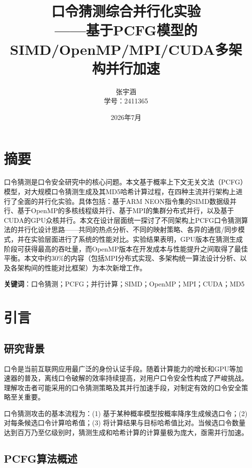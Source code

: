 \documentclass[12pt,a4paper]{ctexart}
\title{{\Huge 口令猜测综合并行化实验}\\[0.5cm]
       {\large ——基于PCFG模型的SIMD/OpenMP/MPI/CUDA多架构并行加速}}
\author{张宇涵\\学号：2411365}
\date{2026年7月}
\begin{document}
\maketitle
\thispagestyle{empty}

\newpage
\tableofcontents
\newpage

\section{摘要}

口令猜测是口令安全研究中的核心问题。本文基于概率上下文无关文法（PCFG）模型，对大规模口令猜测生成及其MD5哈希计算过程，在四种主流并行架构上进行了全面的并行化实验。具体包括：基于ARM NEON指令集的SIMD数据级并行、基于OpenMP的多核线程级并行、基于MPI的集群分布式并行，以及基于CUDA的GPU众核并行。本文在设计层面统一探讨了不同架构上PCFG口令猜测算法的并行化设计思路——共同的热点分析、不同的映射策略、各异的通信/同步模式，并在实验层面进行了系统的性能对比。实验结果表明，GPU版本在猜测生成阶段可获得最高的吞吐量，而OpenMP版本在开发成本与性能提升之间取得了最佳平衡。本文中约30\%的内容（包括MPI分布式实现、多架构统一算法设计分析、以及各架构间的性能对比框架）为本次新增工作。

\textbf{关键词}：口令猜测；PCFG；并行计算；SIMD；OpenMP；MPI；CUDA；MD5

\section{引言}

\subsection{研究背景}

口令是当前互联网应用最广泛的身份认证手段。随着计算能力的增长和GPU等加速器的普及，离线口令破解的效率持续提高，对用户口令安全性构成了严峻挑战。理解攻击者可能采用的口令猜测策略及其并行加速手段，对制定有效的口令安全策略至关重要。

口令猜测攻击的基本流程为：(1) 基于某种概率模型按概率降序生成候选口令；(2) 对每条候选口令计算哈希值；(3) 将计算结果与目标哈希值比对。当候选口令数量达到百万乃至亿级别时，猜测生成和哈希计算的计算量极为庞大，亟需并行加速。

\subsection{PCFG算法概述}
\end{document}
